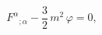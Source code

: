 \begin{equation}
F^{\alpha }{}_{;\alpha }-\frac{3}{2}\,m^{2}\,\varphi =0,
\label{traco}
\end{equation}


